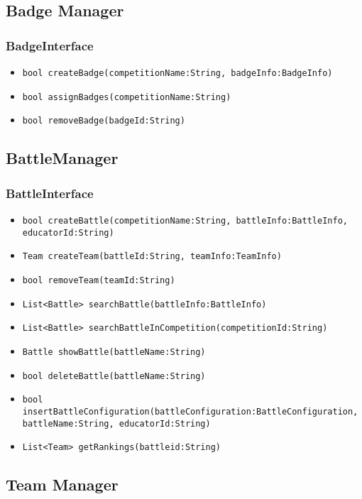\subsection{Badge Manager}
\subsubsection{BadgeInterface}
\begin{itemize}
    \item \texttt{bool createBadge(competitionName:String, badgeInfo:BadgeInfo)}%
    \item \texttt{bool assignBadges(competitionName:String)}
    \item \texttt{bool removeBadge(badgeId:String)}
\end{itemize}

\subsection{BattleManager}
\subsubsection{BattleInterface}
\begin{itemize}
    \item \texttt{bool createBattle(competitionName:String, battleInfo:BattleInfo,\\educatorId:String)}
    \item \texttt{Team createTeam(battleId:String, teamInfo:TeamInfo)}%
    \item \texttt{bool removeTeam(teamId:String)}
    \item \texttt{List<Battle> searchBattle(battleInfo:BattleInfo)}
    \item \texttt{List<Battle> searchBattleInCompetition(competitionId:String)}%
    \item \texttt{Battle showBattle(battleName:String)}
    \item \texttt{bool deleteBattle(battleName:String)}
    \item \texttt{bool insertBattleConfiguration(battleConfiguration:BattleConfiguration, battleName:String, educatorId:String)}%
    \item \texttt{List<Team> getRankings(battleid:String)}
\end{itemize}

\subsection{Team Manager}
